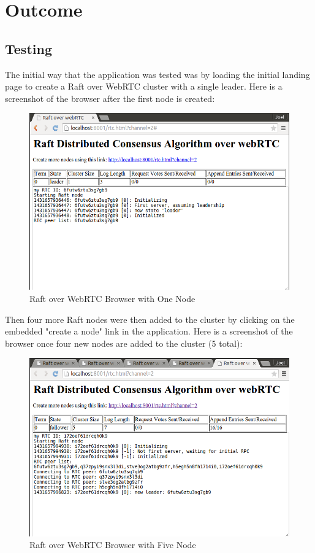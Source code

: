 \documentclass{acmtog} %
\begin{document}
\section{Outcome}

\subsection{Testing}

The initial way that the application was tested was by loading the
initial landing page to create a Raft over WebRTC cluster with
a single leader. Here is a screenshot of the browser after the first
node is created:

\begin{figure}[Ht]
\centerline{\includegraphics[width=15cm]{browser_1}}
\caption{Raft over WebRTC Browser with One Node}
  \label{fig:browser_1}
\end{figure}

Then four more Raft nodes were then added to the cluster by clicking
on the embedded "create a node" link in the application. Here is
a screenshot of the browser once four new nodes are added to the
cluster (5 total):

\begin{figure}[Ht]
\centerline{\includegraphics[width=15cm]{browser_2}}
\caption{Raft over WebRTC Browser with Five Node}
  \label{fig:browser_2}
\end{figure}
\end{document}
